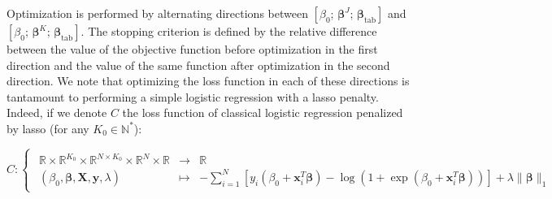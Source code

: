 \documentclass[preprint,12pt]{elsarticle}
\begin{document}
\noindent Optimization is performed by alternating directions between $\left[ \beta_0 ;\, \bm{\beta}^J  ; \,  \bm{\beta}_{\text{tab}}   \right]$ and  $\left[ \beta_0; \, \bm{\beta}^K  ;\, \bm{\beta}_{\text{tab}}  \right]$. The stopping criterion is defined by the relative difference between the value of the objective function before optimization in the first direction and the value of the same function after optimization in the second direction.  We note that optimizing the loss function in each of these directions is tantamount to performing a simple logistic regression with a lasso penalty. Indeed, if we denote $C$ the loss function of classical logistic regression penalized by lasso (for any $K_0 \in \mathbb{N}^{*}$):

\begin{equation}
    C: \begin{cases}
        \begin{array}{ccl}
            \mathbb{R} \times \mathbb{R}^{K_0} \times \mathbb{R}^{N \times K_0} \times \mathbb{R}^{N} \times \mathbb{R} & \longrightarrow & \mathbb{R}                                                                                                                                                                    \\
            (\beta_0, \bm{\beta}, \mathbf{X}, \mathbf{y}, \lambda )                                                     & \longmapsto     & -\displaystyle{\sum\limits_{i = 1}^N} [ y_i(\beta_0 + \mathbf{x}_i^T \bm{\beta}) - \log(1 + \exp(\beta_0 + \mathbf{x}_i^T \bm{\beta})) ] + \lambda \lVert \bm{\beta} \rVert_1
        \end{array}
    \end{cases}
\end{equation}
\end{document}
